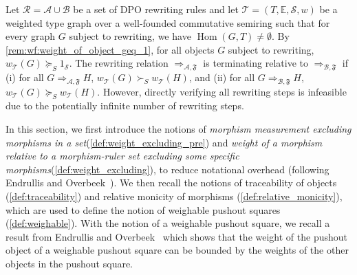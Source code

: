 Let \( \mathcal{R} = \mathcal{A} \cup \mathcal{B} \) be a set of DPO rewriting rules and let $\mathcal{T}=(T,\mathbb{E},\mathcal{S},w)$ be a weighted type graph over a well-founded commutative semiring such that for every graph $G$ subject to rewriting, we have $\operatorname{Hom}(G,T)\neq \emptyset$. By \autoref{rem:wf:weight_of_object_geq_1}, for all objects \( G \) subject to rewriting, \(w_\mathcal{T}(G) \succeq_S 1_\mathcal{S} \).
The rewriting relation \( \Rightarrow_{\mathcal{A},\mathfrak{F}} \) is terminating relative to $\Rightarrow_{\mathcal{B},\mathfrak{F}}$ if (i) for all \(G \Rightarrow_{\mathcal{A},\mathfrak{F}} H\), \( w_\mathcal{T}(G) \succ_S w_\mathcal{T}(H)\), and (ii) for all \(G \Rightarrow_{\mathcal{B},\mathfrak{F}} H\), \( w_\mathcal{T}(G) \succeq_S w_\mathcal{T}(H) \). However, directly verifying all rewriting steps is infeasible due to the potentially infinite number of rewriting steps.

In this section, we first introduce the notions of \emph{morphism measurement excluding morphisms in a set}(\autoref{def:weight_excluding_pre}) and \emph{weight of a morphism relative to a morphism-ruler set excluding some specific morphisms}(\autoref{def:weight_excluding}),
to reduce notational overhead (following Endrullis and Overbeek~\cite{endrullis2024generalized_icgt}).
We then recall the notions of traceability of objects (\autoref{def:traceability}) and relative monicity of morphisms (\autoref{def:relative_monicity}),
which are used to define the notion of weighable pushout squares (\autoref{def:weighable}). With the notion of a weighable pushout square, we recall a result from Endrullis and Overbeek~\cite{endrullis2024generalized_icgt} which shows that the weight of the pushout object of a weighable pushout square can be bounded by the weights of the other objects in the pushout square.


